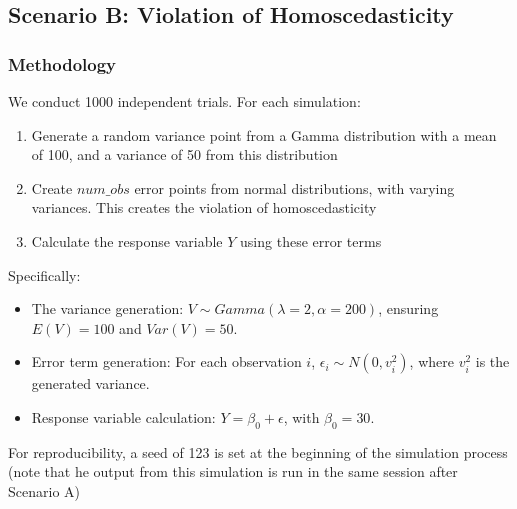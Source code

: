 \documentclass{article}
\begin{document}
\subsection{Scenario B: Violation of Homoscedasticity}
\subsubsection*{Methodology}
We conduct 1000 independent trials. For each simulation:
\begin{enumerate}
    \item Generate a random variance point from a Gamma distribution with a mean of 100, and a variance of 50 from this distribution
    \item Create $num\_obs$ error points from normal distributions, with varying variances. This creates the violation of homoscedasticity
    \item Calculate the response variable $Y$ using these error terms
\end{enumerate}
Specifically:
\begin{itemize}
    \item The variance generation: $V \sim Gamma(\lambda = 2, \alpha = 200)$, ensuring $E(V) = 100$ and $Var(V) = 50$.
    \item Error term generation: For each observation $i$, $\epsilon_i \sim N(0, v_i^2)$, where $v_i^2$ is the generated variance.
    \item Response variable calculation: $Y = \beta_0 + \epsilon$, with $\beta_0 = 30$.
\end{itemize}
For reproducibility, a seed of 123 is set at the beginning of the simulation process (note that he output from this simulation is run in the same session after Scenario A)
\end{document}
